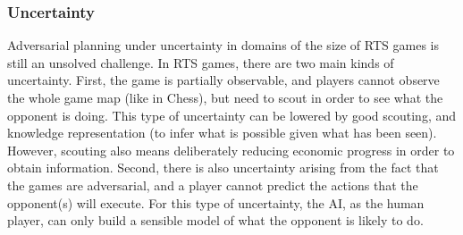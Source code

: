 \documentclass{llncs}
\begin{document}
\subsubsection{Uncertainty}
Adversarial planning under  uncertainty in domains of the  size of RTS
games is  still an unsolved  challenge.  In  RTS games, there  are two
main kinds  of uncertainty. First,  the game is  partially observable,
and players  cannot observe the  whole game  map (like in  Chess), but
need to scout in order to see what the opponent is doing. This type of
uncertainty   can  be   lowered  by   good  scouting,   and  knowledge
representation  (to  infer  what  is  possible  given  what  has  been
seen). However, scouting also means deliberately reducing economic progress in order to obtain information.
Second,  there is also  uncertainty arising from the  fact that
the games  are adversarial,  and a player  cannot predict  the actions
that the opponent(s)  will execute. For this type  of uncertainty, the
AI, as the human  player, can only build a sensible  model of what the
opponent is likely to do.
\end{document}
